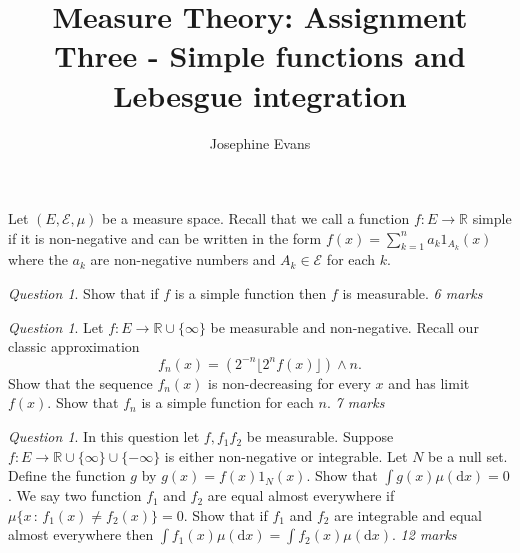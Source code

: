 \documentclass[11pt]{article}
\author{
Josephine Evans
}
\title{Measure Theory: Assignment Three - Simple functions and Lebesgue integration}
\theoremstyle{definition}
\theoremstyle{remark}
\newtheorem{q}[thm]{Question}
\begin{document}
\maketitle
Let $(E, \mathcal{E}, \mu)$ be a measure space. Recall that we call a function $f: E \rightarrow \mathbb{R}$ simple if it is non-negative and can be written in the form $f(x) = \sum_{k=1}^n a_k1_{A_k}(x)$ where the $a_k$ are non-negative numbers and $A_k \in \mathcal{E}$ for each $k$.

\begin{q}
Show that if $f$ is a simple function then $f$ is measurable. \emph{6 marks}
\end{q}

\begin{q}
Let $f: E \rightarrow \mathbb{R}\cup\{\infty\}$ be measurable and non-negative. Recall our classic approximation
\[ f_n(x) = \left(2^{-n} \lfloor 2^n f(x) \rfloor \right)\wedge n. \] Show that the sequence $f_n(x)$ is non-decreasing for every $x$ and has limit $f(x)$. Show that $f_n$ is a simple function for each $n$. \emph{7 marks}
\end{q}

\begin{q}
In this question let $f,f_1f_2$ be measurable. Suppose $f: E \rightarrow \mathbb{R}\cup\{\infty\}\cup\{-\infty\}$ is either non-negative or integrable. Let $N$ be a null set. Define the function $g$ by $g(x) = f(x)1_N(x)$. Show that $\int g(x) \mu(\mathrm{d}x) = 0$. We say two function $f_1$ and $f_2$ are equal almost everywhere if $\mu\{x\,:\, f_1(x) \neq f_2(x)\} = 0$. Show that if $f_1$ and $f_2$ are integrable and equal almost everywhere then $\int f_1(x) \mu(\mathrm{d}x) = \int f_2(x) \mu(\mathrm{d}x)$. \emph{12 marks}
\end{q}
\end{document}

